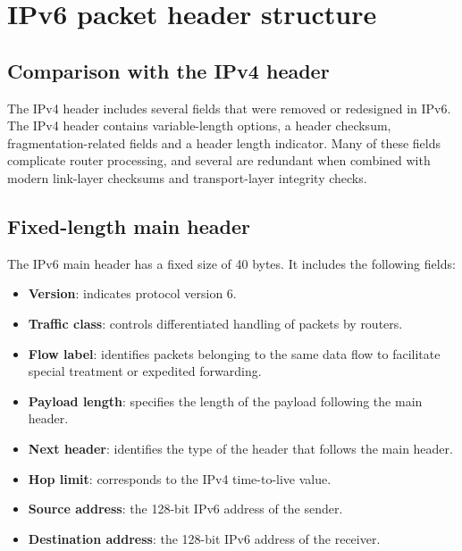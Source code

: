 \begin{center}
\end{center}

\section{IPv6 packet header structure}

\subsection{Comparison with the IPv4 header}

The IPv4 header includes several fields that were removed or redesigned in IPv6. The IPv4 header contains variable-length options, a header checksum, fragmentation-related fields and a header length indicator. Many of these fields complicate router processing, and several are redundant when combined with modern link-layer checksums and transport-layer integrity checks.

\begin{center}
\end{center}

\subsection{Fixed-length main header}

The IPv6 main header has a fixed size of 40 bytes. It includes the following fields:

\begin{itemize}
\item \textbf{Version}: indicates protocol version 6.
\item \textbf{Traffic class}: controls differentiated handling of packets by routers.
\item \textbf{Flow label}: identifies packets belonging to the same data flow to facilitate special treatment or expedited forwarding.
\item \textbf{Payload length}: specifies the length of the payload following the main header.
\item \textbf{Next header}: identifies the type of the header that follows the main header.
\item \textbf{Hop limit}: corresponds to the IPv4 time-to-live value.
\item \textbf{Source address}: the 128-bit IPv6 address of the sender.
\item \textbf{Destination address}: the 128-bit IPv6 address of the receiver.
\end{itemize}

